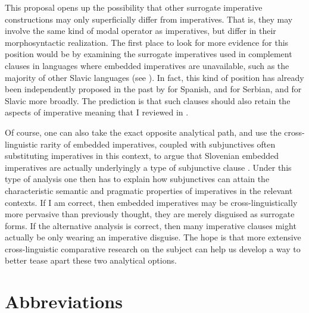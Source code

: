 \documentclass[output=paper,colorlinks,citecolor=brown]{langscibook}
\begin{document}
This proposal opens up the possibility that other surrogate imperative constructions may only superficially differ from imperatives. That is, they may involve the same kind of modal operator as imperatives, but differ in their morphosyntactic realization. The first place to look for more evidence for this position would be by examining the surrogate imperatives used in complement clauses in languages where embedded imperatives are unavailable, such as the majority of other Slavic languages (see ). In fact, this kind of position has already been independently proposed in the past by \citet{kempchinsky86,kempchinsky09} for Spanish, \citet{socanac17} and \citet{kaufmannetal23} for Serbian, and \citet{socanac17} for Slavic more broadly. The prediction is that such clauses should also retain the aspects of imperative meaning that I reviewed in .

Of course, one can also take the exact opposite analytical path, and use the cross-linguistic rarity of embedded imperatives, coupled with subjunctives often substituting imperatives in this context, to argue that Slovenian embedded imperatives are actually underlyingly a type of subjunctive clause \citep[as argued by][]{starkl23}. Under this type of analysis one then has to explain how subjunctives can attain the characteristic semantic and pragmatic properties of imperatives in the relevant contexts. If I am correct, then embedded imperatives may be cross-linguistically more pervasive than previously thought, they are merely disguised as surrogate forms. If the alternative analysis is correct, then many imperative clauses might actually be only wearing an imperative disguise. The hope is that more extensive cross-linguistic comparative research on the subject can help us develop a way to better tease apart these two analytical options.
        

\section*{Abbreviations}
\end{document}
